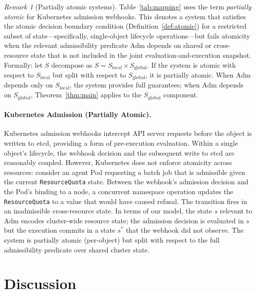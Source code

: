 \documentclass[11pt]{article}
\theoremstyle{plain}
\theoremstyle{definition}
\theoremstyle{remark}
\newtheorem{remark}[theorem]{Remark}
\newcommand{\Adm}{\mathrm{Adm}}
\begin{document}
\begin{remark}[Partially atomic systems]
\label{rem:partial-atomic}
Table~\ref{tab:mapping} uses the term \emph{partially atomic} for
Kubernetes admission webhooks.  This denotes a system that satisfies
the atomic decision boundary condition (Definition~\ref{def:atomic}) for
a restricted subset of state---specifically, single-object lifecycle
operations---but fails atomicity when the relevant admissibility predicate
$\Adm$ depends on shared or cross-resource state that is not included in
the joint evaluation-and-execution snapshot.  Formally: let $S$ decompose
as $S = S_{\mathrm{local}} \times S_{\mathrm{global}}$.  If the system is
atomic with respect to $S_{\mathrm{local}}$ but split with respect to
$S_{\mathrm{global}}$, it is partially atomic.  When $\Adm$ depends only
on $S_{\mathrm{local}}$, the system provides full guarantees; when $\Adm$
depends on $S_{\mathrm{global}}$, Theorem~\ref{thm:main} applies to the
$S_{\mathrm{global}}$ component.
\end{remark}

\paragraph{Kubernetes Admission (Partially Atomic).}
Kubernetes admission webhooks intercept API server requests before the object
is written to etcd, providing a form of pre-execution evaluation.  Within a
single object's lifecycle, the webhook decision and the subsequent write to
etcd are reasonably coupled.  However, Kubernetes does not enforce atomicity
across resources: consider an agent Pod requesting a batch job that is
admissible given the current \texttt{ResourceQuota} state.  Between the
webhook's admission decision and the Pod's binding to a node, a concurrent
namespace operation updates the \texttt{ResourceQuota} to a value that would
have caused refusal.  The transition fires in an inadmissible cross-resource
state.  In terms of our model, the state $s$ relevant to $\Adm$ encodes
cluster-wide resource state; the admission decision is evaluated in $s$ but
the execution commits in a state $s^*$ that the webhook did not observe.  The
system is partially atomic (per-object) but split with respect to the full
admissibility predicate over shared cluster state.

\section{Discussion}
\label{sec:discussion}
\end{document}
